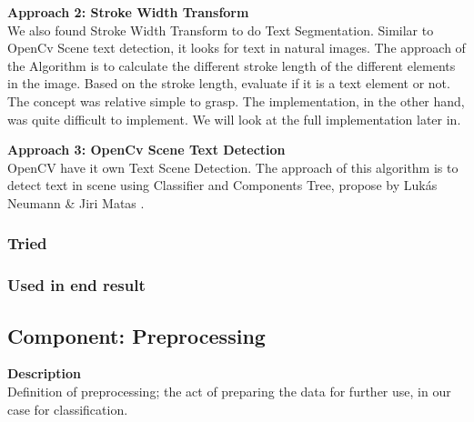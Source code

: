 \documentclass[11pt,a4paper,UKenglish]{article}
\begin{document}
\begin{flushleft}
  \textbf{Approach 2: Stroke Width Transform} \\
  We also found Stroke Width Transform to do Text Segmentation\cite{epshtein_stroke_2010}. Similar to OpenCv Scene text detection, it looks for text in natural images. The approach of the Algorithm is to calculate the different stroke length of the different elements in the image. Based on the stroke length, evaluate if it is a text element or not. The concept was relative simple to grasp. The implementation, in the other hand, was quite difficult to implement. We will look at the full implementation later in.
\end{flushleft}

\begin{flushleft}
  \textbf{Approach 3: OpenCv Scene Text Detection} \\
  OpenCV have it own Text Scene Detection. The approach of this algorithm is to detect text in scene using Classifier and Components Tree, propose by Lukás Neumann \& Jiri Matas \cite{neumann_real-time_2012}.
\end{flushleft}

\subsubsection{Tried}
\subsubsection{Used in end result}

\subsection{Component: Preprocessing}
\label{Method:Preprocessing}
\textbf{Description} \\
Definition of preprocessing; the act of preparing the data for further use,
in our case for classification. \par
\end{document}
